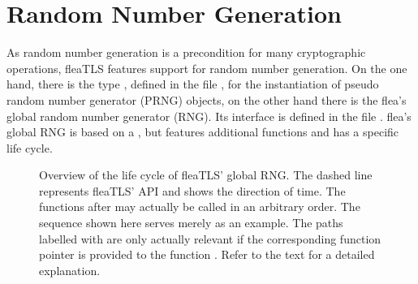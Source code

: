\documentclass[a4paper,11pt]{scrartcl}
\begin{document}

\section{Random Number Generation }
\label{secRng}

As random number generation is a precondition for many cryptographic operations,
fleaTLS features support for random number generation. On the one hand, there is the type , defined in the file
, for the instantiation of
pseudo random number generator (PRNG) objects, on the other hand there is the flea's
global random number generator (RNG). Its interface is defined in the file
. flea's global RNG is based on a
, but features additional functions and has a
specific life cycle.

\begin{figure}

\label{figRngLifeCycle}
\caption{Overview of the life cycle of fleaTLS' global RNG. The dashed line represents
fleaTLS' API and shows the direction of time. 
The functions after \funcLibInit may actually be called in an arbitrary order.
The sequence shown here serves merely as an example.
The paths labelled
with \funcSaveRngState are only actually relevant if the corresponding function
pointer is provided to the function \funcLibInit. Refer to the text for a
detailed explanation.}
\end{figure}
\end{document}
